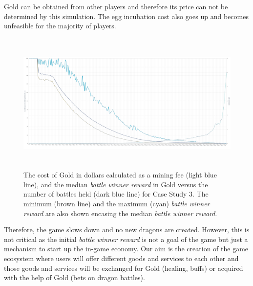 \documentclass[12pt]{article}
\begin{document}


Gold can be obtained from other players and therefore its price can not be determined by this simulation. The egg incubation cost also goes up and becomes unfeasible for the majority of players.\par




\begin{figure}[H]
	\begin{Center}
		\includegraphics[width=6.27in,height=2.78in]{./media/CS3nimage24.png}
        \caption{The cost of Gold in dollars calculated as a mining fee (light blue line), and the median {\it battle winner reward} in Gold versus the number of battles held (dark blue line) for Case Study 3.   The minimum (brown line) and the maximum (cyan) {\it battle winner reward} are also shown encasing the median {\it battle winner reward}.}
		\label{fig:The median battle reward in Gold versus the number of battles held (dark blue line) for Case Study 3.}
	\end{Center}
\end{figure}




Therefore, the game slows down and no new dragons are created. However, this is not critical as the initial \textit{battle winner reward }is not a goal of the game but just a mechanism to start up the in-game economy. Our aim is the creation of the game ecosystem where users will offer different goods and services to each other and those goods and services will be exchanged for Gold (healing, buffs) or acquired with the help of Gold (bets on dragon battles).\par
\end{document}
